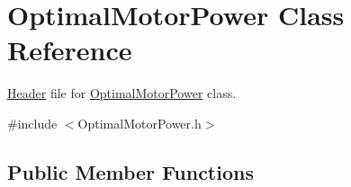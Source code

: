 \hypertarget{class_optimal_motor_power}{}\section{Optimal\+Motor\+Power Class Reference}
\label{class_optimal_motor_power}


\hyperlink{class_header}{Header} file for \hyperlink{class_optimal_motor_power}{Optimal\+Motor\+Power} class.  




{\ttfamily \#include $<$Optimal\+Motor\+Power.\+h$>$}

\subsection*{Public Member Functions}
